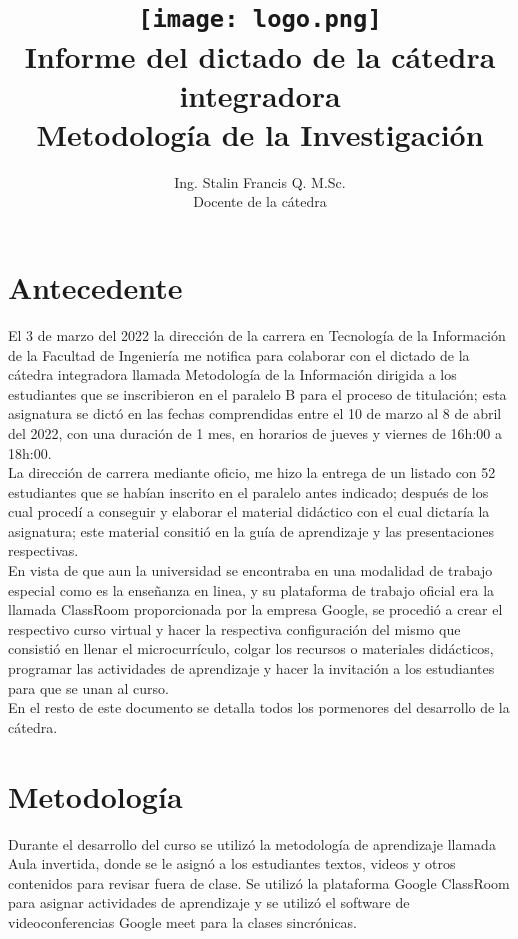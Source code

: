 \documentclass[a4paper,12pt]{article}
\title{\texttt{[image: logo.png]} \\Informe del dictado de la cátedra integradora \\ Metodología de la Investigación}
\begin{document}
\author{Ing. Stalin Francis Q. M.Sc.\\ Docente de la cátedra}
\maketitle
\section{Antecedente}
\label{sec:antecedente}


El 3 de marzo del 2022 la dirección de la carrera en Tecnología de la Información de la Facultad de Ingeniería me notifica para colaborar con el dictado de la cátedra integradora llamada Metodología de la Información dirigida a los estudiantes que se inscribieron en el paralelo B para el proceso de titulación; esta asignatura se dictó en las fechas comprendidas entre el 10 de marzo al 8 de abril del 2022, con una duración de 1 mes, en horarios de jueves y viernes de 16h:00 a 18h:00.\\

La dirección de carrera mediante oficio, me hizo la entrega de un listado con 52 estudiantes que se habían inscrito en el paralelo antes indicado; después de los cual procedí a conseguir y elaborar el material didáctico con el cual dictaría la asignatura; este material consitió en la guía de aprendizaje y las presentaciones respectivas.\\

En vista de que aun la universidad se encontraba en una modalidad de trabajo especial como es la enseñanza en linea, y su plataforma de trabajo oficial era la llamada ClassRoom proporcionada por la empresa Google, se procedió a crear el respectivo curso virtual y hacer la respectiva configuración del mismo que consistió en llenar el microcurrículo, colgar los recursos o materiales didácticos, programar las actividades de aprendizaje y hacer la invitación a los estudiantes para que se unan al curso.\\

En el resto de este documento se detalla todos los pormenores del desarrollo de la cátedra.


\section{Metodología}
\label{sec:metodologia}

Durante el desarrollo del curso se utilizó la metodología de aprendizaje llamada Aula invertida, donde se le asignó a los estudiantes textos, videos y otros contenidos para revisar fuera de clase. Se utilizó la plataforma Google ClassRoom para asignar actividades de aprendizaje y se utilizó  el software de videoconferencias Google meet para la clases sincrónicas.
\end{document}
